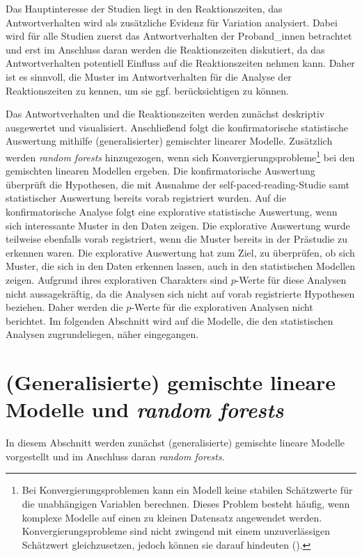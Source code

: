 Das Hauptinteresse der Studien liegt in den Reaktionszeiten, das Antwortverhalten wird als zusätzliche Evidenz für Variation analysiert. Dabei wird für alle Studien zuerst das Antwortverhalten der Proband\_innen betrachtet und erst im Anschluss daran werden die Reaktionszeiten diskutiert, da das Antwortverhalten potentiell Einfluss auf die Reaktionszeiten nehmen kann. Daher ist es sinnvoll, die Muster im Antwortverhalten für die Analyse der Reaktionszeiten zu kennen, um sie ggf. berücksichtigen zu können.

 
Das Antwortverhalten und die Reaktionszeiten werden zunächst deskriptiv ausgewertet und visualisiert. Anschließend folgt die konfirmatorische statistische Auswertung mithilfe (generalisierter) gemischter linearer Modelle. Zusätzlich werden \textit{random forests} hinzugezogen, wenn sich Konvergierungsprobleme\footnote{Bei Konvergierungsproblemen kann ein Modell keine stabilen Schätzwerte für die unabhängigen Variablen berechnen. Dieses Problem besteht häufig, wenn komplexe Modelle auf einen zu kleinen Datensatz angewendet werden. Konvergierungsprobleme sind nicht zwingend mit einem unzuverlässigen Schätzwert gleichzusetzen, jedoch können sie darauf hindeuten (\cite[265--266]{Winter.2020}).} bei den gemischten linearen Modellen ergeben. Die konfirmatorische Auswertung überprüft die Hypothesen, die mit Ausnahme der self-paced-reading-Studie samt statistischer Auswertung bereits vorab registriert wurden. Auf die konfirmatorische Analyse folgt eine explorative statistische Auswertung, wenn sich interessante Muster in den Daten zeigen. Die explorative Auswertung wurde teilweise ebenfalls vorab registriert, wenn die Muster bereits in der Prästudie zu erkennen waren.  Die explorative Auswertung hat zum Ziel, zu überprüfen, ob sich Muster, die sich in den Daten erkennen lassen, auch in den statistischen Modellen zeigen. Aufgrund ihres explorativen Charakters sind $p$-Werte für diese Analysen nicht aussagekräftig, da die Analysen sich nicht auf vorab registrierte Hypothesen beziehen. Daher werden die $p$-Werte für die explorativen Analysen nicht berichtet.  Im folgenden Abschnitt wird auf die Modelle, die den statistischen Analysen zugrundeliegen, näher eingegangen.

\section{(Generalisierte) gemischte lineare Modelle und \textit{random forests}}

In diesem Abschnitt werden zunächst (generalisierte) gemischte lineare Modelle vorgestellt und im Anschluss daran \textit{random forests}.

